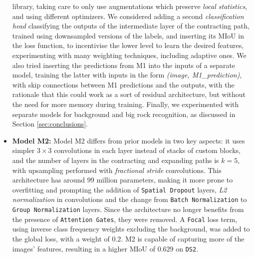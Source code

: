 \documentclass[11pt]{article}
\begin{document}
\begin{multicols}{2}
\begin{itemize}[leftmargin=*]
            library, taking care to only use augmentations which preserve \textit{local statistics}, and using different optimizers. We considered adding a second \textit{classification head} classifying the outputs of the intermediate layer of the contracting path, trained using downsampled versions of the labels, and inserting its MIoU in the loss function, to incentivise the lower level to learn the desired features, experimenting with many weighting techniques, including adaptive ones. We also tried inserting the predictions from M1 into the inputs of a separate model, training the latter with inputs in the form \textit{(image, M1\_prediction)}, with skip connections between M1 predictions and the outputs, with the rationale that this could work as a sort of residual architecture, but without the need for more memory during training. Finally, we experimented with separate models for background and big rock recognition, as discussed in Section \ref{sec:conclusions}.
            \item \textbf{Model M2:} Model M2 differs from prior models in two key aspects: it uses simpler $3\times3$ convolutions in each layer instead of stacks of custom blocks, and the number of layers in the contracting and expanding paths is $k=5$, with upsampling performed with \textit{fractional stride} convolutions. This architecture has around $99$ million parameters, making it more prone to overfitting and prompting the addition of \texttt{Spatial Dropout} layers, \textit{L2 normalization} in convolutions and the change from \texttt{Batch Normalization} to \texttt{Group Normalization} layers. Since the architecture no longer benefits from the presence of \texttt{Attention Gates}, they were removed. A \texttt{Focal}\cite{lin2018focallossdenseobject} loss term, using inverse class frequency weights excluding the background, was added to the global loss, with a weight of $0.2$. M2 is capable of capturing more of the images' features, resulting in a higher MIoU of $0.629$ on \texttt{DS2}.
      \end{itemize}



\end{multicols}
\end{document}
